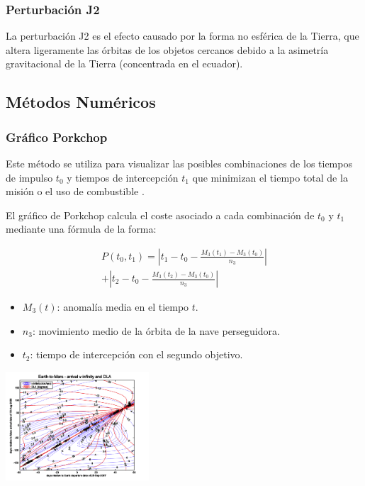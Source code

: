 \subsubsection{Perturbación J2}
La perturbación J2 es el efecto causado por la forma no esférica de la Tierra,
que altera ligeramente las órbitas de los objetos cercanos debido a la
asimetría gravitacional de la Tierra (concentrada en el ecuador).
%
\subsection{Métodos Numéricos}
\subsubsection{Gráfico Porkchop}
Este método se utiliza para visualizar las posibles combinaciones de los
tiempos de impulso $t_0$ y tiempos de intercepción $t_1$ que minimizan el
tiempo total de la misión o el uso de combustible \parencite{DUAN2020965}.

El gráfico de Porkchop calcula el coste asociado a cada combinación de $t_0$ y
$t_1$ mediante una fórmula de la forma:

\begin{equation}
    \begin{split}
        P(t_0, t_1) = \left| t_1 - t_0 - \frac{M_3(t_1) - M_3(t_0)}{n_3} \right| \\
        + \left| t_2 - t_0 - \frac{M_3(t_2) - M_3(t_0)}{n_3} \right|
    \end{split}
\end{equation}

\begin{itemize}
    \item $M_3(t)$: anomalía media en el tiempo $t$.
    \item $n_3$: movimiento medio de la órbita de la nave perseguidora.
    \item $t_2$: tiempo de intercepción con el segundo objetivo.
\end{itemize}

\begin{center}
    \includegraphics[width=0.4\textwidth]{porkchop_ejemplo.png}
     \parencite{eagle2025}
\end{center}


